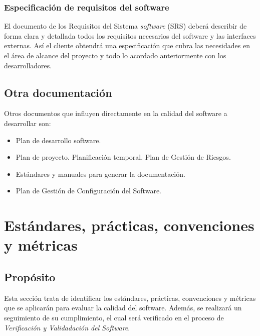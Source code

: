 \documentclass[11pt, a4paper, twoside, titlepage]{article}
\begin{document}
				\subsubsection{Especificación de requisitos del software}
					El documento de los Requisitos del Sistema {\itshape software} (SRS) deberá describir de forma clara y detallada todos los requisitos necesarios del software y las interfaces externas. Así el cliente obtendrá una especificación que cubra las necesidades en el área de alcance del proyecto y todo lo acordado anteriormente con los desarrolladores.
		
		\subsection{Otra documentación}
			
			Otros documentos que influyen directamente en la calidad del software a desarrollar son:

			\begin{itemize}
				\item Plan de desarrollo software.
				\item Plan de proyecto.
					\subitem Planificación temporal.
					\subitem Plan de Gestión de Riesgos.
				\item Estándares y manuales para generar la documentación.
				\item Plan de Gestión de Configuración del Software.
			\end{itemize}
			
	\section{Estándares, prácticas, convenciones y métricas} %
		\subsection{Propósito}

			Esta sección trata de identificar los estándares, prácticas, convenciones y métricas que se aplicarán para evaluar la calidad del software. Además, se realizará un seguimiento de su cumplimiento, el cual será verificado en el proceso de \textit{Verificación y Validadación del Software}.
\end{document}
